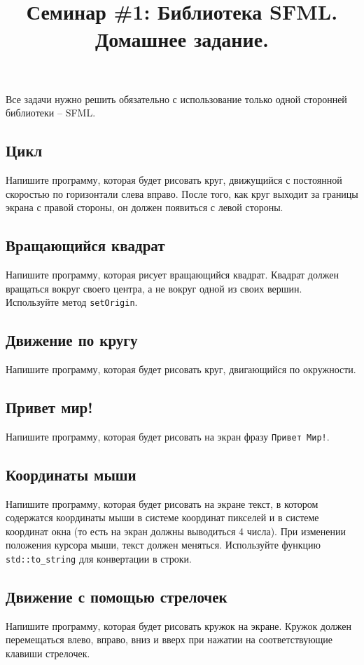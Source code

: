 \documentclass{article}
\begin{document}
\title{Семинар \#1: Библиотека SFML. Домашнее задание.\vspace{-5ex}}\date{}\maketitle
Все задачи нужно решить обязательно с использование только одной сторонней библиотеки -- SFML.

\subsection{Цикл}
Напишите программу, которая будет рисовать круг, движущийся с постоянной скоростью по горизонтали слева вправо. После того, как круг выходит за границы экрана с правой стороны, он должен появиться с левой стороны.

\subsection{Вращающийся квадрат}
Напишите программу, которая рисует вращающийся квадрат. Квадрат должен вращаться вокруг своего центра, а не вокруг одной из своих вершин. Используйте метод \texttt{setOrigin}.

\subsection{Движение по кругу}
Напишите программу, которая будет рисовать круг, двигающийся по окружности.

\subsection{Привет мир!}
Напишите программу, которая будет рисовать на экран фразу \texttt{Привет Мир!}.

\subsection{Координаты мыши}
Напишите программу, которая будет рисовать на экране текст, в котором содержатся координаты мыши в системе координат пикселей и в системе координат окна (то есть на экран должны выводиться 4 числа). При изменении положения курсора мыши, текст должен меняться. Используйте функцию \texttt{std::to\_string} для конвертации в строки.

\subsection{Движение с помощью стрелочек}
Напишите программу, которая будет рисовать кружок на экране. Кружок должен перемещаться влево, вправо, вниз и вверх при нажатии на соответствующие клавиши стрелочек.
\end{document}
